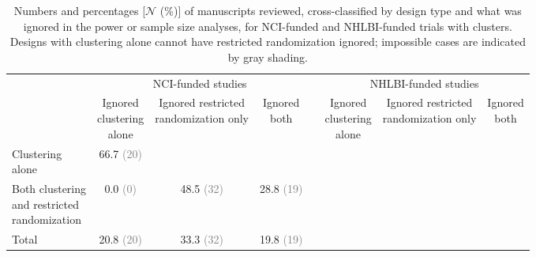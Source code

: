 \documentclass{article}
\newcommand{\pctN}[2]{#1 {\textcolor{gray}{(#2)}}}
\begin{document}
\begin{landscape}
\begin{table}[p]
\large\rmfamily\centering
\captionsetup{width=9in, font=large, labelfont=normalfont, textfont=normalfont}
\caption{Numbers and percentages [$\mathcal{N}$ (\%)] of manuscripts reviewed, cross-classified by design type and what was ignored in the power or sample size analyses, for NCI-funded and NHLBI-funded trials with clusters. Designs with clustering alone cannot have restricted randomization ignored; impossible cases are indicated by gray shading.}
\label{tab:IgnoredPower}
\setlength{\tabcolsep}{8pt}
\begin{tabular}{l ccc p{18pt} ccc}
\toprule
& \multicolumn{3}{c}{NCI-funded studies} & & \multicolumn{3}{c}{NHLBI-funded studies} \\
\cmidrule(lr){2-4}\cmidrule(lr){6-8}
& \makecell[t]{Ignored\\clustering\\alone}
& \makecell[t]{Ignored restricted\\randomization only}
& \makecell[t]{Ignored\\both}
&
& \makecell[t]{Ignored\\clustering\\alone}
& \makecell[t]{Ignored restricted\\randomization only}
& \makecell[t]{Ignored\\both} \\
\midrule
\shortstack[l]{Clustering\\alone}
  & \pctN{66.7}{20} & \cellcolor[gray]{0.85} & \cellcolor[gray]{0.85}
  & & & \cellcolor[gray]{0.85} & \cellcolor[gray]{0.85} \\[10pt]
\shortstack[l]{Both clustering\\and restricted\\randomization}
  & \pctN{0.0}{0} & \pctN{48.5}{32} & \pctN{28.8}{19}
  & & & & \\[10pt]
Total
  & \pctN{20.8}{20} & \pctN{33.3}{32} & \pctN{19.8}{19}
  & & & & \\
\bottomrule
\end{tabular}
\end{table}
\end{landscape}

\clearpage
\end{document}

